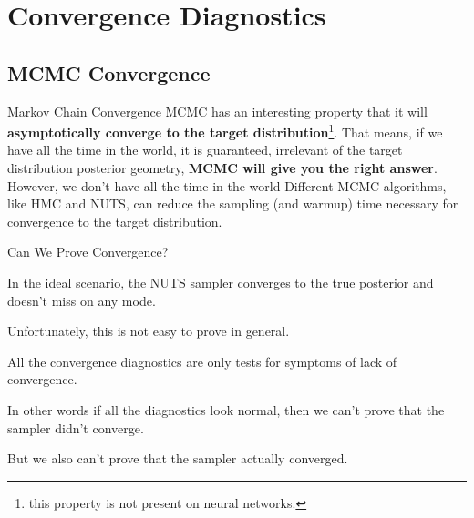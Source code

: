 
\section{Convergence Diagnostics}

\subsection{MCMC Convergence}
\begin{frame}{Markov Chain Convergence}
    MCMC has an interesting property that it will
    \textbf{asymptotically converge to the target distribution}\footnote{
        this property is not present on neural networks.}.
    \vfill
    That means, if we have all the time in the world, it is guaranteed,
    irrelevant of the target distribution posterior geometry,
    \textbf{MCMC will give you the right answer}.
    \vfill
    However, we don't have all the time in the world
    Different MCMC algorithms, like HMC and NUTS,
    can reduce the sampling (and warmup) time necessary for convergence to the target distribution.
\end{frame}

\begin{frame}{Can We Prove Convergence?}
    \begin{vfilleditems}
        \item In the ideal scenario, the NUTS sampler converges to the true posterior and doesn't miss on any mode.
        \item Unfortunately, this is not easy to prove in general.
        \item All the convergence diagnostics are only tests for symptoms of lack of convergence.
        \item In other words if all the diagnostics look normal, then we can't prove that the sampler didn't converge.
        \item But we also can't prove that the sampler actually converged.
    \end{vfilleditems}
\end{frame}


